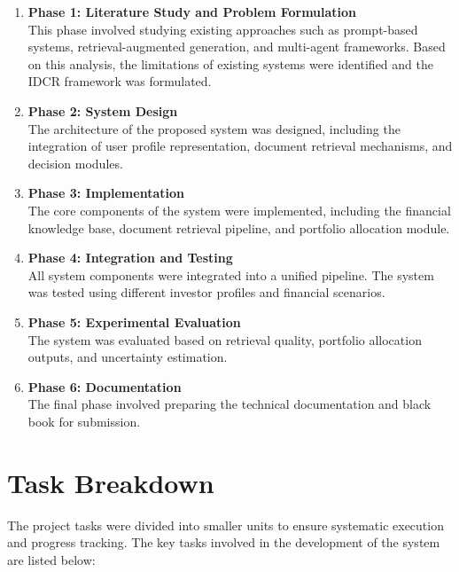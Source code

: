 \documentclass[12pt,a4paper,oneside]{report}
\theoremstyle{definition}
\theoremstyle{remark}
\begin{document}
\begin{enumerate}

\item \textbf{Phase 1: Literature Study and Problem Formulation} \\
This phase involved studying existing approaches such as prompt-based systems, retrieval-augmented generation, and multi-agent frameworks. Based on this analysis, the limitations of existing systems were identified and the IDCR framework was formulated.

\item \textbf{Phase 2: System Design} \\
The architecture of the proposed system was designed, including the integration of user profile representation, document retrieval mechanisms, and decision modules.

\item \textbf{Phase 3: Implementation} \\
The core components of the system were implemented, including the financial knowledge base, document retrieval pipeline, and portfolio allocation module.

\item \textbf{Phase 4: Integration and Testing} \\
All system components were integrated into a unified pipeline. The system was tested using different investor profiles and financial scenarios.

\item \textbf{Phase 5: Experimental Evaluation} \\
The system was evaluated based on retrieval quality, portfolio allocation outputs, and uncertainty estimation.

\item \textbf{Phase 6: Documentation} \\
The final phase involved preparing the technical documentation and black book for submission.

\end{enumerate}

\section{Task Breakdown}

The project tasks were divided into smaller units to ensure systematic execution and progress tracking. The key tasks involved in the development of the system are listed below:
\end{document}
